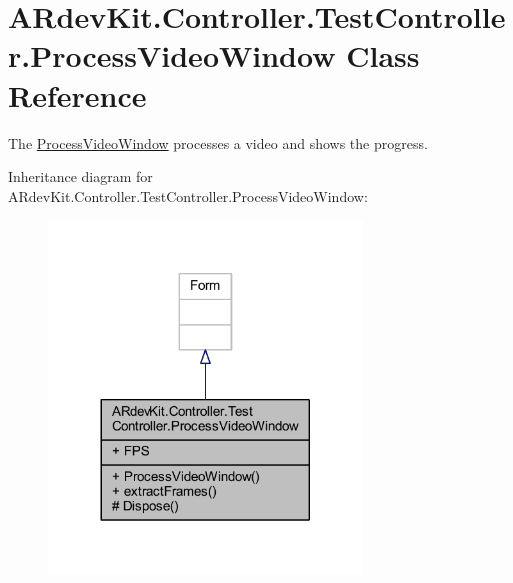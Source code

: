 \hypertarget{class_a_rdev_kit_1_1_controller_1_1_test_controller_1_1_process_video_window}{\section{A\-Rdev\-Kit.\-Controller.\-Test\-Controller.\-Process\-Video\-Window Class Reference}
\label{class_a_rdev_kit_1_1_controller_1_1_test_controller_1_1_process_video_window}
}


The \hyperlink{class_a_rdev_kit_1_1_controller_1_1_test_controller_1_1_process_video_window}{Process\-Video\-Window} processes a video and shows the progress.  




Inheritance diagram for A\-Rdev\-Kit.\-Controller.\-Test\-Controller.\-Process\-Video\-Window\-:
\nopagebreak
\begin{figure}[H]
\begin{center}
\leavevmode
\includegraphics[width=236pt]{class_a_rdev_kit_1_1_controller_1_1_test_controller_1_1_process_video_window__inherit__graph}
\end{center}
\end{figure}


